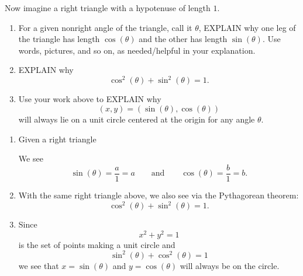 \documentclass[noauthor,nooutcomes,hints,handout]{ximera}
\begin{document}
\begin{question}
  Now imagine a right triangle with a hypotenuse of length $1$. 
  \begin{enumerate}
  \item For a given nonright angle of the triangle, call it $\theta$,
    EXPLAIN why one leg of the triangle has length $\cos(\theta)$ and
    the other has length $\sin(\theta)$.  Use words, pictures, and so
    on, as needed/helpful in your explanation.
  \item EXPLAIN why
    \[
    \cos^2(\theta) + \sin^2(\theta) = 1.
    \]
  \item Use your work above to EXPLAIN why
    \[
    (x,y) = (\sin(\theta),\cos(\theta))
    \]
    will always lie on a unit circle centered at the origin for any
    angle $\theta$.
  \end{enumerate}
  \begin{freeResponse}
    \begin{enumerate}
    \item Given a right triangle
    \begin{center}
    \end{center}
    We see
    \[
    \sin(\theta) = \frac{a}{1} = a\qquad \text{and}\qquad \cos(\theta) = \frac{b}{1} = b.
    \]
  \item With the same right triangle above, we also see via the Pythagorean theorem:
    \[
    \cos^2(\theta) + \sin^2(\theta) = 1.
    \]
  \item Since
    \[
    x^2+y^2=1
    \]
    is the set of points making a unit circle and
    \[
    \sin^2(\theta) + \cos^2(\theta) = 1
    \]
    we see that $x=\sin(\theta)$ and $y=\cos(\theta)$ will always be
    on the circle.
    \end{enumerate}
  \end{freeResponse}
\end{question}
\mynewpage
\end{document}

